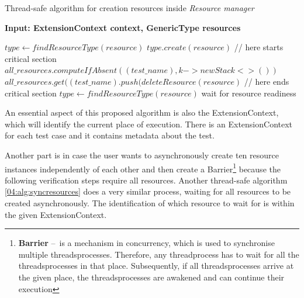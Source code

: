 \begin{algorithm}[H]
    \label{04:alg:creationofresource}
    \caption{Thread-safe algorithm for creation resources inside \emph{Resource manager}}

    \hspace*{\algorithmicindent} \textbf{Input: ExtensionContext context, GenericType resources}

    \begin{algorithmic}[1]
        \State $type \gets findResourceType(resource)$
        \State $type.create(resource)$
        \State // here starts critical section
        \State $all\_resources.computeIfAbsent((test\_name), k -> new Stack<>())$
        \State $all\_resources.get((test\_name).push(deleteResource(resource)$
        \State // here ends critical section
            \State $type \gets findResourceType(resource)$
            \State wait for resource readiness
            \EndForEach
        \EndIf
        \EndForEach
    \end{algorithmic}
\end{algorithm}

An essential aspect of this proposed algorithm is also the ExtensionContext, which will identify the current place of execution.
There is an ExtensionContext for each test case and it contains metadata about the test.

Another part is in case the user wants to asynchronously create ten resource instances independently of each other and then create a Barrier\footnote {\textbf{Barrier} \---\ is a mechanism in concurrency, which is used to synchronise multiple threads\/processes. Therefore, any thread\/process has to wait for all the threads\/processes in that place. Subsequently, if all threads\/processes arrive at the given place, the threads\/processes are awakened and can continue their execution} because the following verification steps require all resources.
Another thread-safe algorithm \ref{04:alg:syncresources} does a very similar process, waiting for all resources to be created asynchronously.
The identification of which resource to wait for is within the given ExtensionContext.

